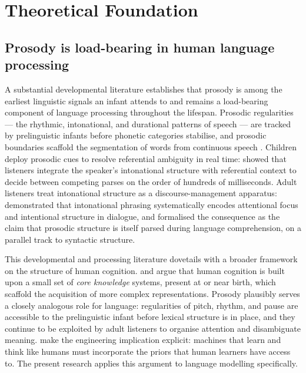 \documentclass[11pt,letterpaper]{article}
\begin{document}
\section{Theoretical Foundation}\label{sec:theory}

\subsection{Prosody is load-bearing in human language processing}

A substantial developmental literature establishes that prosody is among the earliest linguistic signals an infant attends to and remains a load-bearing component of language processing throughout the lifespan. Prosodic regularities --- the rhythmic, intonational, and durational patterns of speech --- are tracked by prelinguistic infants before phonetic categories stabilise, and prosodic boundaries scaffold the segmentation of words from continuous speech \citep{prieto2018}. Children deploy prosodic cues to resolve referential ambiguity in real time: \citet{snedeker2003} showed that listeners integrate the speaker's intonational structure with referential context to decide between competing parses on the order of hundreds of milliseconds. Adult listeners treat intonational structure as a discourse-management apparatus: \citet{hirschberg1986} demonstrated that intonational phrasing systematically encodes attentional focus and intentional structure in dialogue, and \citet{beckman1996} formalised the consequence as the claim that prosodic structure is itself parsed during language comprehension, on a parallel track to syntactic structure.

This developmental and processing literature dovetails with a broader framework on the structure of human cognition. \citet{spelke2007} and \citet{spelke2022} argue that human cognition is built upon a small set of \emph{core knowledge} systems, present at or near birth, which scaffold the acquisition of more complex representations. Prosody plausibly serves a closely analogous role for language: regularities of pitch, rhythm, and pause are accessible to the prelinguistic infant before lexical structure is in place, and they continue to be exploited by adult listeners to organise attention and disambiguate meaning. \citet{lake2017} make the engineering implication explicit: machines that learn and think like humans must incorporate the priors that human learners have access to. The present research applies this argument to language modelling specifically.
\end{document}
